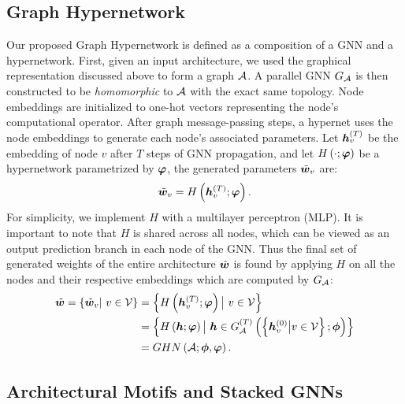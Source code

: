\subsection{Graph Hypernetwork}
Our proposed Graph Hypernetwork is defined as a composition of a GNN and a hypernetwork. First,
given an input architecture, we used the graphical representation discussed above to form a graph
${\mathcal{A}}$. A parallel GNN $G_{\mathcal{A}}$ is then constructed to be \textit{homomorphic} to ${\mathcal{A}}$ with the exact
same topology. Node embeddings are initialized to one-hot vectors representing the node's
computational operator. After graph message-passing steps, a hypernet uses the node embeddings to
generate each node's associated parameters. Let ${\bm{h}}_v^{(T)}$ be the embedding of node $v$ after $T$
steps of GNN propagation, and let $H \left(\cdot; {\bm{\varphi}}\right)$ be a hypernetwork parametrized by
${\bm{\varphi}}$, the generated parameters $\tilde{{\bm{w}}}_v$ are:
\begin{equation}
\tilde{{\bm{w}}}_v = H \left({\bm{h}}_v^{(T)}; {\bm{\varphi}}\right).
\end{equation}
For simplicity, we implement $H$ with a multilayer perceptron (MLP). It is important to note that
$H$ is shared across all nodes, which can be viewed as an output prediction branch in each node of
the GNN. 
Thus the final set of generated weights of the entire architecture $\tilde{{\bm{w}}}$ is found by applying $H$ on all the nodes and their respective embeddings which are computed by $G_{\mathcal{A}}$:
\begin{align}
\tilde{{\bm{w}}}=\left\{\tilde{{\bm{w}}}_v | \ v \in {\mathcal{V}}  \right\}
   &= \left\{H\left({\bm{h}}_v^{(T)}; {\bm{\varphi}}\right) \big| \ v \in {\mathcal{V}}  \right\} \\
  &=  \left\{H\left({\bm{h}}; {\bm{\varphi}}\right) \big| \ {\bm{h}} \in G_{\mathcal{A}}^{(T)}\left(\left\{{\bm{h}}_v^{(0)} \big| v \in {\mathcal{V}} \right\}; {\bm{\phi}}\right)\right\} \\
  &= GHN\left({\mathcal{A}}; {\bm{\phi}}, {\bm{\varphi}}\right).
\end{align}

\subsection{Architectural Motifs and Stacked GNNs}
\label{section:graph_cells}


